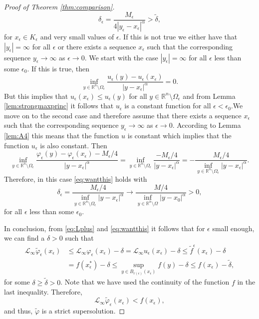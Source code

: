 \documentclass[11pt]{article}
\providecommand{\Linf}{\mathcal{L}_{\infty}}
\providecommand{\Rn}{\mathbb{R}^n}
\numberwithin{equation}{section}
\theoremstyle{definition}
\begin{document}
\begin{proof}[Proof of Theorem \ref{thm:comparison}]
\begin{equation}
\label{eq:delta_bound}
    \delta_{\epsilon} = \frac{M_{\epsilon}}{4|y_{\epsilon}-x_{\epsilon}|^{\alpha}} > \tilde{\delta},
\end{equation}
for $x_{\epsilon} \in K_{\epsilon}$ and very small values of $\epsilon$. If this is not true we either have that $|y_{\epsilon}|=\infty$ for all $\epsilon$ or there exists a sequence $x_{\epsilon}$ such that the corresponding sequence $y_{\epsilon} \to \infty$ as $\epsilon \to 0$. We start with the case $|y_{\epsilon}|=\infty$ for all $\epsilon$ less than some $\epsilon_0$. If this is true, then
$$
 \inf_{y \in \Rn \setminus \Omega_{\epsilon}} \frac{u_{\epsilon}(y)-u_{\epsilon}(x_{\epsilon})}{|y-x_{\epsilon}|^{\alpha}} =0.
$$
But this implies that $u_{\epsilon}(x_{\epsilon}) \leq u_{\epsilon}(y)$ for all $y \in \Rn \setminus \Omega_{\epsilon}$ and from Lemma \ref{lem:strongmaxprinc} it follows that $u_{\epsilon}$ is a constant function for all $\epsilon < \epsilon_0$.We move on to the second case and therefore assume that there exists a sequence $x_{\epsilon}$ such that the corresponding sequence $y_{\epsilon} \to \infty$ as $\epsilon \to 0$. According to Lemma \ref{lem:A4} this means that the function $u$ is constant which implies that the function $u_{\epsilon}$ is also constant. Then
\begin{equation*}
\inf_{y \in \Rn \setminus \Omega_{\epsilon}} \frac{\varphi_{\epsilon}(y) - \varphi_{\epsilon}(x_{\epsilon})-M_{\epsilon}/4}{|y-x_{\epsilon}|^{\alpha}} = \inf_{y \in \Rn \setminus \Omega_{\epsilon}} \frac{-M_{\epsilon}/4}{|y-x_{\epsilon}|^{\alpha}} = -\frac{M_{\epsilon}/4}{\inf_{y \in \Rn \setminus \Omega_{\epsilon}} |y-x_{\epsilon}|^{\alpha}}.
\end{equation*}
Therefore, in this case \eqref{eq:wantthis} holds with
$$
\delta_{\epsilon} = \frac{M_{\epsilon}/4}{\inf_{y \in \Rn \setminus \Omega_{\epsilon}} |y-x_{\epsilon}|^{\alpha}} \to  \frac{M/4}{\inf_{y \in \Rn \setminus \Omega} |y-x_0|^{\alpha}} >0,
$$
for all $\epsilon$ less than some $\epsilon_0$.

In conclusion, from \eqref{eq:Lplus} and \eqref{eq:wantthis} it follows that for $\epsilon$ small enough, we can find a $\delta > 0$ such that
\begin{align*}
    \Linf \tilde{\varphi}_{\epsilon}(x_{\epsilon}) &\leq \Linf \varphi_{\epsilon}(x_{\epsilon})- \delta  =\Linf u_{\epsilon}(x_{\epsilon}) - \delta  \label{eq:rhs_cont}
     \leq  \tilde{f}^{\epsilon}(x_{\epsilon})-\delta  \\
    & =f(x_{\epsilon}^*) -\delta  \leq \sup_{y \in B_{r(\epsilon)}(x_{\epsilon})} f(y)-\delta \leq f(x_{\epsilon})-\tilde{\delta}, \nonumber
\end{align*}
for some $\delta \geq \tilde{\delta}>0$. Note that we have used the continuity of the function $f$ in the last inequality. Therefore,
\begin{equation}\label{eq:contradiction3}
   \Linf \tilde{\varphi}_{\epsilon}(x_{\epsilon}) < f(x_{\epsilon}), 
\end{equation}
and thus, $\tilde{\varphi}$ is a strict supersolution.


\end{proof}
\end{document}
